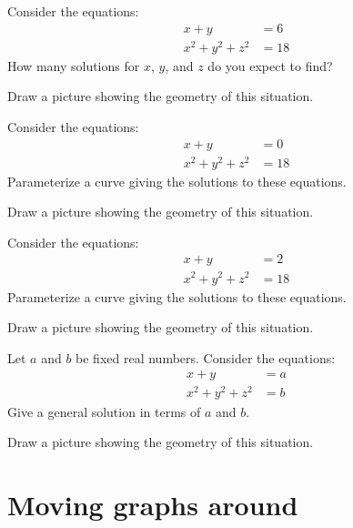 \documentclass[handout,hints,noauthor,nooutcomes]{ximera}
\begin{document}
\begin{problem}
  Consider the equations:
  \begin{align*}
    x+y &= 6\\
    x^2+y^2+z^2 &= 18
  \end{align*}
  How many solutions for $x$, $y$, and $z$ do you expect to find?
  \begin{hint}
    Draw a picture showing the geometry of this situation.
  \end{hint}
\end{problem}

\begin{problem}
  Consider the equations:
  \begin{align*}
    x+y &= 0\\
    x^2+y^2+z^2 &= 18
  \end{align*}
    Parameterize a curve giving the solutions to these equations.
    \begin{hint}
      Draw a picture showing the geometry of this situation.
    \end{hint}
\end{problem}


\begin{problem}
  Consider the equations:
  \begin{align*}
    x+y &= 2\\
    x^2+y^2+z^2 &= 18
  \end{align*}
    Parameterize a curve giving the solutions to these equations.
    \begin{hint}
      Draw a picture showing the geometry of this situation.
    \end{hint}
\end{problem}


\begin{problem}
  Let $a$ and $b$ be fixed real numbers. Consider the equations:
  \begin{align*}
    x+y &= a\\
    x^2+y^2+z^2 &= b
  \end{align*}
  Give a general solution in terms of $a$ and $b$.
  \begin{hint}
    Draw a picture showing the geometry of this situation.
  \end{hint}
\end{problem}







\section{Moving graphs around}
\end{document}
